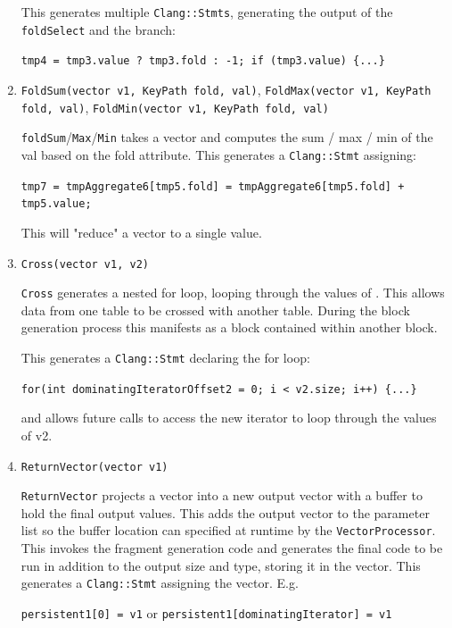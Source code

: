 \begin{enumerate}
This generates multiple \texttt{Clang::Stmts}, generating the output of the \texttt{foldSelect} and the branch:

{\centering\texttt{tmp4 = tmp3.value ? tmp3.fold : -1; if (tmp3.value) \{{...\}}}\par}

\item \texttt{FoldSum(vector v1, KeyPath fold, val)}, \texttt{FoldMax(vector v1, KeyPath fold, val)}, \texttt{FoldMin(vector v1, KeyPath fold, val)}

\texttt{foldSum}/\texttt{Max}/\texttt{Min} takes a vector and computes the sum / max / min of the val based on the fold attribute. This generates a \texttt{Clang::Stmt} assigning:

{\centering\texttt{tmp7 = tmpAggregate6[tmp5.fold] = tmpAggregate6[tmp5.fold] + tmp5.value;}\par}

This will "reduce" a vector to a single value. 

\item \texttt{Cross(vector v1, v2)}

\texttt{Cross} generates a nested for loop, looping through the values of . This allows data from one table to be crossed with another table. During the block generation process this manifests as a block contained within another block.

This generates a \texttt{Clang::Stmt} declaring the for loop:

{\centering\texttt{for(int dominatingIteratorOffset2 = 0; i < v2.size; i++) \{{...\}}}\par}

and allows future calls to access the new iterator to loop through the values of v2.

\item \texttt{ReturnVector(vector v1)}

\texttt{ReturnVector} projects a vector into a new output vector with a buffer to hold the final output values. This adds the output vector to the parameter list so the buffer location can specified at runtime by the \texttt{VectorProcessor}. This invokes the fragment generation code and generates the final code to be run in addition to the output size and type, storing it in the vector. This generates a \texttt{Clang::Stmt} assigning the vector. E.g.

{\centering\texttt{persistent1[0] = v1} or \texttt{persistent1[dominatingIterator] = v1}\par}


\end{enumerate}
